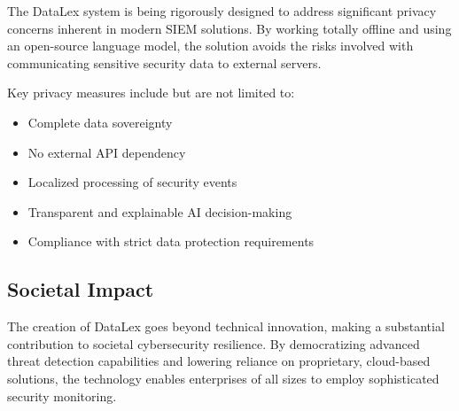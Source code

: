 The DataLex system is being rigorously designed to address significant privacy concerns inherent in modern SIEM solutions. By working totally offline and using an open-source language model, the solution avoids the risks involved with communicating sensitive security data to external servers.

Key privacy measures include but are not limited to:

\begin{itemize}
    \item Complete data sovereignty
    \item No external API dependency
    \item Localized processing of security events
    \item Transparent and explainable AI decision-making
    \item Compliance with strict data protection requirements
\end{itemize}

\subsection{Societal Impact}
\label{subsec_societal_impact}

The creation of DataLex goes beyond technical innovation, making a substantial contribution to societal cybersecurity resilience. By democratizing advanced threat detection capabilities and lowering reliance on proprietary, cloud-based solutions, the technology enables enterprises of all sizes to employ sophisticated security monitoring.
